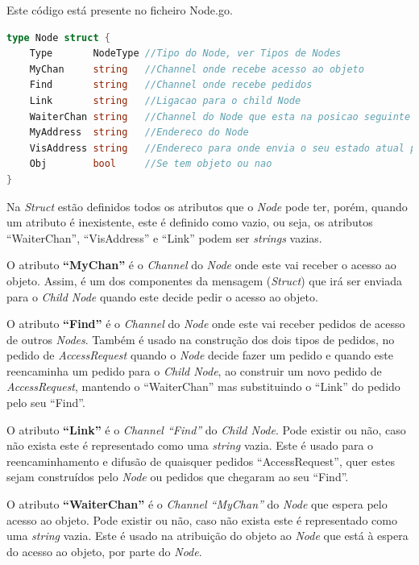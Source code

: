 Este código está presente no ficheiro Node.go.


\begin{lstlisting}[caption={Definição da estrutura \emph{Node}},language=Go]
type Node struct {
	Type       NodeType //Tipo do Node, ver Tipos de Nodes
	MyChan     string   //Channel onde recebe acesso ao objeto
	Find       string   //Channel onde recebe pedidos
	Link       string   //Ligacao para o child Node
	WaiterChan string   //Channel do Node que esta na posicao seguinte da fila
	MyAddress  string   //Endereco do Node
	VisAddress string   //Endereco para onde envia o seu estado atual para a atualizacao da visualizacao
	Obj        bool     //Se tem objeto ou nao 
}

\end{lstlisting}
Na \emph{Struct} estão definidos todos os atributos que o \emph{Node} pode ter, porém, quando um atributo é inexistente, este é definido como vazio, ou seja, os atributos ``WaiterChan'', ``VisAddress'' e ``Link'' podem ser \emph{strings} vazias.

O atributo \textbf{``MyChan''} é o \emph{Channel} do \emph{Node} onde este vai receber o acesso ao objeto.
Assim, é um dos componentes da mensagem (\emph{Struct}) que irá ser enviada para o \emph{Child Node} quando este decide pedir o acesso ao objeto.

O atributo \textbf{``Find''} é o \emph{Channel} do \emph{Node} onde este vai receber pedidos de acesso de outros \emph{Nodes}. 
Também é usado na construção dos dois tipos de pedidos, no pedido de \emph{AccessRequest} quando o \emph{Node} decide fazer um pedido e quando este reencaminha um pedido para o \emph{Child Node}, ao construir um novo pedido de \emph{AccessRequest}, mantendo o ``WaiterChan'' mas substituindo o ``Link'' do pedido pelo seu ``Find''.

O atributo \textbf{``Link''} é o \emph{Channel ``Find''} do \emph{Child Node}. Pode existir ou não, caso não exista este é representado como uma \emph{string} vazia.
Este é usado para o reencaminhamento e difusão de quaisquer pedidos ``AccessRequest'', quer estes sejam construídos pelo \emph{Node} ou pedidos que chegaram ao seu ``Find''.

O atributo \textbf{``WaiterChan''} é o \emph{Channel ``MyChan''} do \emph{Node} que espera pelo acesso ao objeto. Pode existir ou não, caso não exista este é representado como uma \emph{string} vazia.
Este é usado na atribuição do objeto ao \emph{Node} que está à espera do acesso ao objeto, por parte do \emph{Node}.

